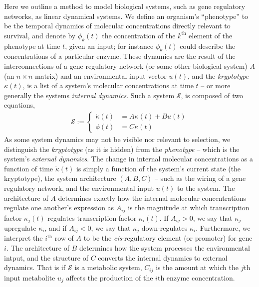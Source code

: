 \documentclass{article}
\newcommand{\js}[1]{\todo[color=green!25]{#1}}
\newcommand{\1}{\mathbbm{1}}
\begin{document}
\js{Will rewrite this section again.} Here we outline a method to model biological systems, such as gene regulatory networks, as linear dynamical systems. 
We define an organism's ``phenotype'' to be the temporal dynamics of molecular concentrations directly relevant to survival, 
and denote by $\phi_k(t)$ the concentration of the $k^\text{th}$ element of the phenotype at time $t$, given an input; for instance $\phi_k(t)$ could describe the concentrations of a particular enzyme.
These dynamics are the result of the interconnections of 
a gene regulatory network (or some other biological system) $A$ (an $n \times n$ matrix) 
and an environmental input vector $u(t)$, and the \emph{kryptotype} $\kappa(t)$, is a list of a system's molecular concentrations at time $t$ -- or more generally the systems \emph{internal dynamics}. 
Such a system $\mathcal{S}$, is composed of two equations,
  \begin{align}
    \mathcal{S} := \left\{ \begin{array}{ll} \dot{\kappa}(t) &= A \kappa(t) + B u(t) \\ \phi(t) &= C \kappa(t) \end{array} \right.
  \end{align}
As some system dynamics may not be visible nor relevant to selection, we distinguish the \emph{kryptotype} (as it is hidden) from the \emph{phenotype} -- which is the system's \emph{external dynamics}.
The change in internal molecular concentrations as a function of time $\dot{\kappa}(t)$ is simply a function of the system's current state (the kryptotype), the system architecture $(A,B,C)$ -- such as the wiring of a gene regulatory network, and the environmental input $u(t)$ to the system. The architecture of $A$ determines exactly how the internal molecular concentrations regulate one another's expression as $A_{ij}$ is the magnitude at which transcription factor $\kappa_j(t)$ regulates transcription factor $\kappa_i(t)$. If $A_{ij} > 0$, we say that $\kappa_j$ upregulate $\kappa_i$, and if $A_{ij} < 0$, we say that $\kappa_j$ down-regulates $\kappa_i$. Furthermore, we interpret the $i^\text{th}$ row of $A$ to be the \emph{cis}-regulatory element (or promoter) for gene $i$.  
The architecture of $B$ determines how the system processes the environmental intput, and the structure of $C$ converts the internal dynamics to external dynamics. That is if $\mathcal{S}$ is a metabolic system, $C_{ij}$ is the amount at which the $j$th input metabolite $u_j$ affects the production of the $i$th enzyme concentration.  
\end{document}
